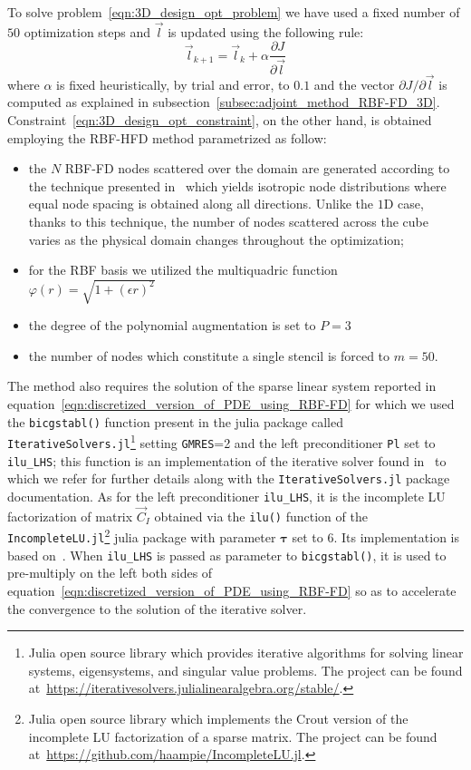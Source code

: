 \medskip
To solve problem~\eqref{eqn:3D_design_opt_problem} we have used a fixed number of $50$ optimization steps and $\vec{l}$ is updated using the following rule:
\begin{equation}
	\vec{l}_{k+1} = \vec{l}_k + \alpha \frac{\partial J}{\partial \vec{l}}
\end{equation}
where $\alpha$ is fixed heuristically, by trial and error, to $0.1$ and the vector $\partial J / \partial \vec{l}$ is computed as explained in subsection~\ref{subsec:adjoint_method_RBF-FD_3D}.
Constraint~\eqref{eqn:3D_design_opt_constraint}, on the other hand, is obtained employing the RBF-HFD method parametrized as follow:
\begin{itemize}
	\item the $N$ RBF-FD nodes scattered over the domain are generated according to the technique presented in~\cite{Zamolo:phd_thesis} which yields isotropic node distributions where equal node spacing is obtained along all directions. Unlike the $1$D case, thanks to this technique, the number of nodes scattered across the cube varies as the physical domain changes throughout the optimization;
	\item for the RBF basis we utilized the multiquadric function $\varphi(r) = \sqrt{1 + (\epsilon r)^2}$
	\item the degree of the polynomial augmentation is set to $P = 3$
	\item the number of nodes which constitute a single stencil is forced to $m = 50$.  %
\end{itemize}
The method also requires the solution of the sparse linear system reported in equation~\eqref{eqn:discretized_version_of_PDE_using_RBF-FD} for which we used the \verb|bicgstabl()| function present in the julia package called \verb|IterativeSolvers.jl|\footnote{Julia open source library which provides iterative algorithms for solving linear systems, eigensystems, and singular value problems. The project can be found at~\url{https://iterativesolvers.julialinearalgebra.org/stable/}.} setting \verb|GMRES|=2 and the left preconditioner \verb|Pl| set to \verb|ilu_LHS|; this function is an implementation of the iterative solver found in~\cite{Sleijpen:bicgstabl_paper} to which we refer for further details along with the \verb|IterativeSolvers.jl| package documentation.
As for the left preconditioner \verb|ilu_LHS|, it is the incomplete LU factorization of matrix $\vec{C}_I$ obtained via the \verb|ilu()| function of the \verb|IncompleteLU.jl|\footnote{Julia open source library which implements the Crout version of the incomplete LU factorization of a sparse matrix. The project can be found at~\url{https://github.com/haampie/IncompleteLU.jl}.} julia package with parameter $\boldsymbol{\tau}$ set to $6$. Its implementation is based on~\cite{NaLi:crout_ilu_paper}.
When \verb|ilu_LHS| is passed as parameter to \verb|bicgstabl()|, it is used to pre-multiply on the left both sides of equation~\eqref{eqn:discretized_version_of_PDE_using_RBF-FD} so as to accelerate the convergence to the solution of the iterative solver.


